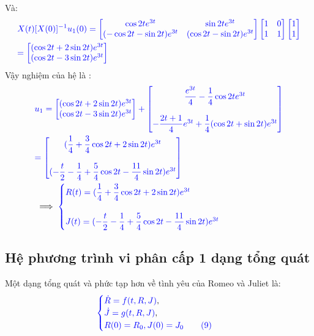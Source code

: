 \documentclass[a4paper]{article}
\begin{document}
 Và: 
 \begin{align}
 &\textcolor{blue}{X(t)[X(0)]^{-1}u_1(0)=\begin{bmatrix} \cos{2t}e^{3t} & \sin{2t}e^{3t}\\ (-\cos{2t}-\sin{2t})e^{3t} & (\cos{2t}-\sin{2t})e^{3t} \end{bmatrix}\begin{bmatrix} 
 1 & 0\\ 1 & 1 \end{bmatrix} \begin{bmatrix} 1 \\ 1 \end{bmatrix}}\\
 &\textcolor{blue}{= \begin{bmatrix} (\cos{2t}+2\sin{2t})e^{3t}\\ (\cos{2t}-3\sin{2t})e^{3t} \end{bmatrix}}
 \end{align}
 Vậy nghiệm của hệ là :
 \begin{align}
  & \textcolor{blue}{  u_1=\begin{bmatrix} (\cos{2t}+2\sin{2t})e^{3t}\\ (\cos{2t}-3\sin{2t})e^{3t} \end{bmatrix}+\begin{bmatrix} \dfrac{e^{3t}}{4}-\dfrac{1}{4}\cos{2t}e^{3t}   \\\\ -\dfrac{2t+1}{4}e^{3t}+\dfrac{1}{4}(\cos{2t}+\sin{2t})e^{3t}\end{bmatrix}}\\
  &\textcolor{blue}{=\begin{bmatrix} (\dfrac{1}{4}+\dfrac{3}{4}\cos{2t} +2\sin{2t})e^{3t} \\\\ (-\dfrac{t}{2}-\dfrac{1}{4}+\dfrac{5}{4}\cos{2t}-\dfrac{11}{4}\sin{2t})e^{3t}\end{bmatrix}}\\
 &\implies\textcolor{blue}{  \begin{cases}
     \textcolor{blue}
{R(t)=(\dfrac{1}{4}+\dfrac{3}{4}\cos{2t} +2\sin{2t})e^{3t} }\\\\\textcolor{blue}
{J(t)=(-\dfrac{t}{2}-\dfrac{1}{4}+\dfrac{5}{4}\cos{2t}-\dfrac{11}{4}\sin{2t})e^{3t}}
\end{cases}}
 \end{align}
	\subsection{Hệ phương trình vi phân cấp 1 dạng tổng quát}
Một dạng tổng quát và phức tạp hơn về tình yêu của Romeo và Juliet là:
\begin{align*}
        \textcolor{blue}{
        \begin{cases}
            \dot R = f(t, R, J) \textcolor{black}{,}\\
            \dot J = g(t, R, J) \textcolor{black}{,}\\
            R(0) = R_{0},
            J(0) = J_{0}
            \tag{9}
        \end{cases}}
    \end{align*}
\end{document}
